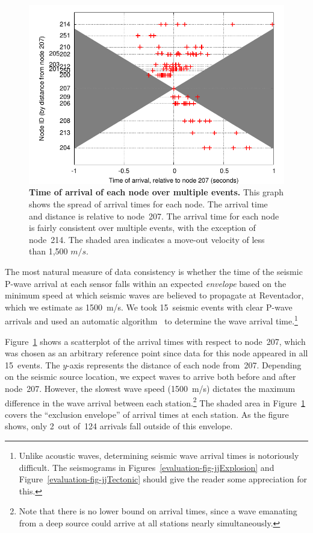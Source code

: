 \begin{figure}[t]
\label{evaluation-fig-seismicArrivalScatteredNode}
\begin{center}
\includegraphics[width=\hsize]{./5-evaluation/figs/fidelity/seismicArrival/arrivalTimesPlotScatteredNode.pdf}
\end{center}
\caption{\textbf{Time of arrival of each node over multiple events.}
This graph shows the spread of arrival times for each node.  The arrival time
and distance is relative to node~207.  The arrival time for each node is
fairly consistent over multiple events, with the exception of node~214.  The
shaded area indicates a move-out velocity of less than 1,500 $m/s$.}
\end{figure}

The most natural measure of data consistency is whether the time of the
seismic P-wave arrival at each sensor falls within an expected {\em envelope}
based on the minimum speed at which seismic waves are believed to propagate
at Reventador, which we estimate as 1500~m/s. We took 15~seismic events with
clear P-wave arrivals and used an automatic algorithm~\cite{pwave-picking} to
determine the wave arrival time.\footnote{Unlike acoustic waves, determining
seismic wave arrival times is notoriously difficult. The seismograms in
Figures~\ref{evaluation-fig-jjExplosion} and
Figure~\ref{evaluation-fig-jjTectonic} should give the reader some
appreciation for this.} 

Figure~\ref{evaluation-fig-seismicArrivalScatteredNode} shows a scatterplot
of the arrival times with respect to node~207, which was chosen as an
arbitrary reference point since data for this node appeared in all 15~events.
The $y$-axis represents the distance of each node from~207. Depending on the
seismic source location, we expect waves to arrive both before and after
node~207.  However, the slowest wave speed (1500~m/s) dictates the maximum
difference in the wave arrival between each station.\footnote{Note that there
is no lower bound on arrival times, since a wave emanating from a deep source
could arrive at all stations nearly simultaneously.} The shaded area in
Figure~\ref{evaluation-fig-seismicArrivalScatteredNode} covers the
``exclusion envelope'' of arrival times at each station.  As the figure
shows, only 2~out of~124 arrivals fall outside of this envelope.

